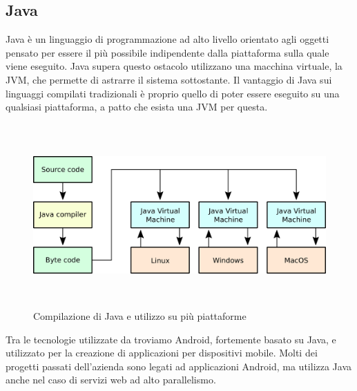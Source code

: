    \subsection{Java}
   Java è un linguaggio di programmazione ad alto livello orientato agli oggetti pensato per essere il più possibile indipendente dalla piattaforma sulla quale viene eseguito. Java supera questo ostacolo utilizzano una macchina virtuale, la \gls{JVM}, che permette di astrarre il sistema sottostante. Il vantaggio di Java sui linguaggi compilati tradizionali è proprio quello di poter essere eseguito su una qualsiasi piattaforma, a patto che esista una \gls{JVM} per questa.
   \begin{figure}[H]
      \begin{center}
         \includegraphics[width=16.5cm,height=7cm,keepaspectratio]{immagini/processo-compilazione-java}
      \end{center}
      \caption{Compilazione di Java e utilizzo su più piattaforme}
   \end{figure}
   Tra le tecnologie utilizzate da \nomeAzienda{} troviamo Android, fortemente basato su Java, e utilizzato per la creazione di applicazioni per dispositivi mobile. Molti dei progetti passati dell'azienda sono legati ad applicazioni Android, ma \nomeAzienda{} utilizza Java anche nel caso di servizi web ad alto parallelismo.
